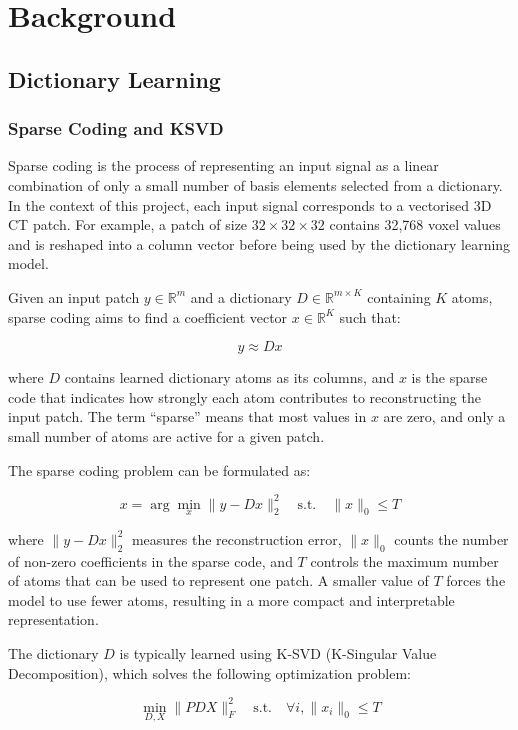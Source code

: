﻿\chapter{Background}

\section{Dictionary Learning}

\subsection{Sparse Coding and KSVD}

Sparse coding is the process of representing an input signal as a linear combination of only a small number of basis elements selected from a dictionary. In the context of this project, each input signal corresponds to a vectorised 3D CT patch. For example, a patch of size $32 \times 32 \times 32$ contains 32,768 voxel values and is reshaped into a column vector before being used by the dictionary learning model.

Given an input patch $y \in \mathbb{R}^{m}$ and a dictionary $D \in \mathbb{R}^{m \times K}$ containing $K$ atoms, sparse coding aims to find a coefficient vector $x \in \mathbb{R}^{K}$ such that:

\[
y \approx Dx
\]

where $D$ contains learned dictionary atoms as its columns, and $x$ is the sparse code that indicates how strongly each atom contributes to reconstructing the input patch. The term ``sparse'' means that most values in $x$ are zero, and only a small number of atoms are active for a given patch.

The sparse coding problem can be formulated as:

\[
x = \arg\min_x \|y - Dx\|_2^2
\quad \text{s.t.} \quad \|x\|_0 \leq T
\]

where $\|y - Dx\|_2^2$ measures the reconstruction error, $\|x\|_0$ counts the number of non-zero coefficients in the sparse code, and $T$ controls the maximum number of atoms that can be used to represent one patch. A smaller value of $T$ forces the model to use fewer atoms, resulting in a more compact and interpretable representation.

The dictionary $D$ is typically learned using K-SVD (K-Singular Value Decomposition), which solves the following optimization problem:

$$
\min_{D, X} \|P  DX\|_F^2 \quad \text{s.t.} \quad \forall i, \|x_i\|_0 \leq T 
$$

